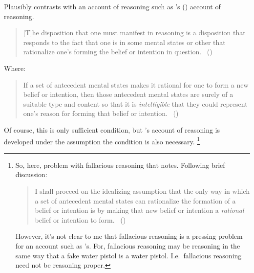 \begin{note}
  Plausibly contrasts with an account of reasoning such as \citeauthor{Wedgwood:2006ui}'s (\citeyear{Wedgwood:2006ui}) account of reasoning.

  \begin{quote}
    [T]he disposition that one must manifest in reasoning is a disposition that responds to the fact that one is in some mental states or other that rationalize one's forming the belief or intention in question.\newline
    \mbox{ }\hfill\mbox{(\citeyear[672]{Wedgwood:2006ui})}
  \end{quote}

  Where:

  \begin{quote}
    If a set of antecedent mental states makes it rational for one to form a new belief or intention, then those antecedent mental states are surely of a suitable type and content so that it is \emph{intelligible} that they could represent one's reason for forming that belief or intention.\newline
    \mbox{ }\hfill\mbox{(\citeyear[662]{Wedgwood:2006ui})}
  \end{quote}

  Of course, this is only sufficient condition, but \citeauthor{Wedgwood:2006ui}'s account of reasoning is developed under the assumption the condition is also necessary.%
  \footnote{
    So, here, problem with fallacious reasoning that \citeauthor{Wedgwood:2006ui} notes.
    Following brief discussion:
    \begin{quote}
      I shall proceed on the idealizing assumption that the only way in which a set of antecedent mental states can rationalize the formation of a belief or intention is by making that new belief or intention a \emph{rational} belief or intention to form.\newline
      \mbox{ }\hfill\mbox{(\citeyear[662]{Wedgwood:2006ui})}
    \end{quote}
    However, it's not clear to me that fallacious reasoning is a pressing problem for an account such as \citeauthor{Wedgwood:2006ui}'s.
    For, fallacious reasoning may be reasoning in the same way that a fake water pistol is a water pistol.
    I.e.\ fallacious reasoning need not be reasoning proper.
  }
\end{note}

